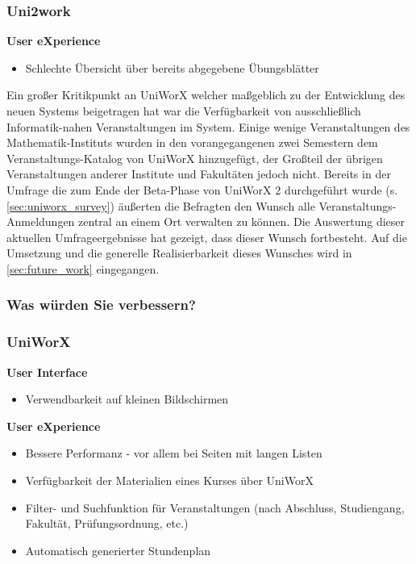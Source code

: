 \documentclass[11pt,a4paper,twoside,ngerman]{article}
\begin{document}
\subsubsection*{Uni2work}
\hspace{6mm}\textbf{User eXperience}
\begin{itemize}
    \item Schlechte Übersicht über bereits abgegebene Übungsblätter
\end{itemize}

\noindent
Ein großer Kritikpunkt an UniWorX welcher maßgeblich zu der Entwicklung des neuen Systems beigetragen hat war die Verfügbarkeit von ausschließlich Informatik-nahen Veranstaltungen im System. Einige wenige Veranstaltungen des Mathematik-Instituts wurden in den vorangegangenen zwei Semestern dem Veranstaltungs-Katalog von UniWorX hinzugefügt, der Großteil der übrigen Veranstaltungen anderer Institute und Fakultäten jedoch nicht.
Bereits in der Umfrage die zum Ende der Beta-Phase von UniWorX 2 durchgeführt wurde (s. \autoref{sec:uniworx_survey}) äußerten die Befragten den Wunsch alle Veranstaltungs-Anmeldungen zentral an einem Ort verwalten zu können. Die Auswertung dieser aktuellen Umfrageergebnisse hat gezeigt, dass dieser Wunsch fortbesteht. Auf die Umsetzung und die generelle Realisierbarkeit dieses Wunsches wird in \autoref{sec:future_work} eingegangen.

\subsubsection{Was würden Sie verbessern?}
\subsubsection*{UniWorX}
\hspace{6mm}\textbf{User Interface}
\begin{itemize}
    \item Verwendbarkeit auf kleinen Bildschirmen
\end{itemize}
    
\noindent\hspace{6mm}\textbf{User eXperience}
\begin{itemize}
    \item Bessere Performanz - vor allem bei Seiten mit langen Listen
    \item Verfügbarkeit der Materialien eines Kurses über UniWorX
    \item Filter- und Suchfunktion für Veranstaltungen (nach Abschluss, Studiengang, Fakultät, Prüfungsordnung, etc.)
    \item Automatisch generierter Stundenplan
\end{itemize}
\end{document}
